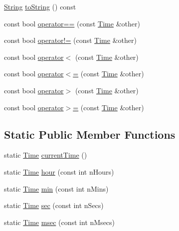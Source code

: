 \begin{DoxyCompactItemize}
\item 
\hyperlink{classprism_1_1_string}{String} \hyperlink{classprism_1_1_time_a1bb4fbb063aff43d3640334baaea281d}{to\+String} () const 
\item 
const bool \hyperlink{classprism_1_1_time_ae621f5954eea065f7b7b6b4a5f0ec473}{operator==} (const \hyperlink{classprism_1_1_time}{Time} \&other)
\item 
const bool \hyperlink{classprism_1_1_time_ada6a112edfbddbad8c470b17b445a0bb}{operator!=} (const \hyperlink{classprism_1_1_time}{Time} \&other)
\item 
const bool \hyperlink{classprism_1_1_time_a3684da92ae24473788c06240ea5af1ee}{operator$<$} (const \hyperlink{classprism_1_1_time}{Time} \&other)
\item 
const bool \hyperlink{classprism_1_1_time_a892e6fb8bbf197bebc44950683722f17}{operator$<$=} (const \hyperlink{classprism_1_1_time}{Time} \&other)
\item 
const bool \hyperlink{classprism_1_1_time_ae155a256da81c7edee4e0c5e3915fde5}{operator$>$} (const \hyperlink{classprism_1_1_time}{Time} \&other)
\item 
const bool \hyperlink{classprism_1_1_time_ad379fc491dfb79e5215dda85a0150335}{operator$>$=} (const \hyperlink{classprism_1_1_time}{Time} \&other)
\end{DoxyCompactItemize}
\subsection*{Static Public Member Functions}
\begin{DoxyCompactItemize}
\item 
static \hyperlink{classprism_1_1_time}{Time} \hyperlink{classprism_1_1_time_ae440b8eee979a64a49fd026087d8bd5a}{current\+Time} ()
\item 
static \hyperlink{classprism_1_1_time}{Time} \hyperlink{classprism_1_1_time_adc2fffc1f771980417d2f91c661dff94}{hour} (const int n\+Hours)
\item 
static \hyperlink{classprism_1_1_time}{Time} \hyperlink{classprism_1_1_time_a0af1d18ebbc757c3e731b191e0165be9}{min} (const int n\+Mins)
\item 
static \hyperlink{classprism_1_1_time}{Time} \hyperlink{classprism_1_1_time_a5c2bde2875a4195c1947a3e6fd7bbcea}{sec} (const int n\+Secs)
\item 
static \hyperlink{classprism_1_1_time}{Time} \hyperlink{classprism_1_1_time_a6d835c48733a1f245101756039441441}{msec} (const int n\+Msecs)
\end{DoxyCompactItemize}
